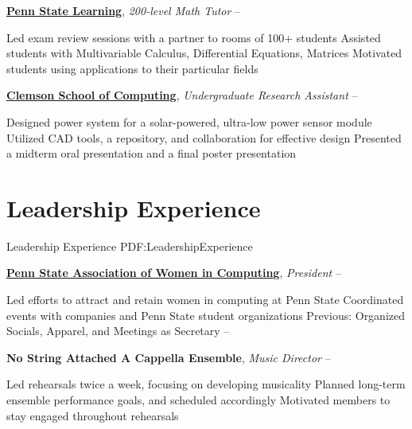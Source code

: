 \documentclass[letterpaper,10pt,oneside]{article}
\begin{document}
\begin{body}
\GapNoBreak
\href{https://pennstatelearning.psu.edu/}
{\textbf{Penn State Learning}},
\textit{200-level Math Tutor}
\hfill
{} --
\begin{detail}
\SubBulletItem
Led exam review sessions with a partner to rooms of 100+ students
\SubBulletItem
Assisted students with Multivariable Calculus, Differential Equations, Matrices
\SubBulletItem
Motivated students using applications to their particular fields
\end{detail}

\GapNoBreak
\href{http://www.clemson.edu/ces/departments/computing/}
{\textbf{Clemson School of Computing}},
\textit{Undergraduate Research Assistant}
\hfill
{} --
\begin{detail}
\SubBulletItem
Designed power system for a solar-powered, ultra-low power sensor module
\SubBulletItem
Utilized CAD tools, a repository, and collaboration for effective design
\SubBulletItem
Presented a midterm oral presentation and a final poster presentation
\end{detail}


\section
{Leadership Experience}
{Leadership Experience}
{PDF:LeadershipExperience}

\href{http://awc.cse.psu.edu/}
{\textbf{Penn State Association of Women in Computing}},
\textit{President}
\hfill
{} --
\begin{detail}
\SubBulletItem
Led efforts to attract and retain women in computing at Penn State
\SubBulletItem
Coordinated events with companies and Penn State student organizations
\SubBulletItem
Previous: Organized Socials, Apparel, and Meetings as Secretary
\hfill
{} --
\end{detail}

\GapNoBreak
\textbf{No String Attached A Cappella Ensemble},
\textit{Music Director}
\hfill
{} --
\begin{detail}
\SubBulletItem
Led rehearsals twice a week, focusing on developing musicality
\SubBulletItem
Planned long-term ensemble performance goals, and scheduled accordingly
\SubBulletItem
Motivated members to stay engaged throughout rehearsals
\end{detail}


\end{body}
\end{document}
